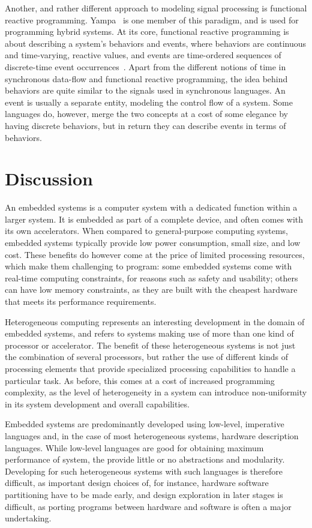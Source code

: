 \documentclass[../paper.tex]{subfiles}
\begin{document}
Another, and rather different approach to modeling signal processing is functional reactive programming. Yampa~\cite{yampa2003} is one member of this paradigm, and is used for programming hybrid systems. At its core, functional reactive programming is about describing a system's behaviors and events, where behaviors are continuous and time-varying, reactive values, and events are time-ordered sequences of discrete-time event occurrences~\cite{nilsson2002}. Apart from the different notions of time in synchronous data-flow and functional reactive programming, the idea behind behaviors are quite similar to the signals used in synchronous languages. An event is usually a separate entity, modeling the control flow of a system. Some languages do, however, merge the two concepts at a cost of some elegance by having discrete behaviors, but in return they can describe events in terms of behaviors.

\section{Discussion}
\label{disc}

An embedded systems is a computer system with a dedicated function within a larger system. It is embedded as part of a complete device, and often comes with its own accelerators. When compared to general-purpose computing systems, embedded systems typically provide low power consumption, small size, and low cost. These benefits do however come at the price of limited processing resources, which make them challenging to program: some embedded systems come with real-time computing constraints, for reasons such as safety and usability; others can have low memory constraints, as they are built with the cheapest hardware that meets its performance requirements.

Heterogeneous computing represents an interesting development in the domain of embedded systems, and refers to systems making use of more than one kind of processor or accelerator. The benefit of these heterogeneous systems is not just the combination of several processors, but rather the use of different kinds of processing elements that provide specialized processing capabilities to handle a particular task. As before, this comes at a cost of increased programming complexity, as the level of heterogeneity in a system can introduce non-uniformity in its system development and overall capabilities.

Embedded systems are predominantly developed using low-level, imperative languages and, in the case of most heterogeneous systems, hardware description languages. While low-level languages are good for obtaining maximum performance of system, the provide little or no abstractions and modularity. Developing for such heterogeneous systems with such languages is therefore difficult, as important design choices of, for instance, hardware software partitioning have to be made early, and design exploration in later stages is difficult, as porting programs between hardware and software is often a major undertaking.
\end{document}
